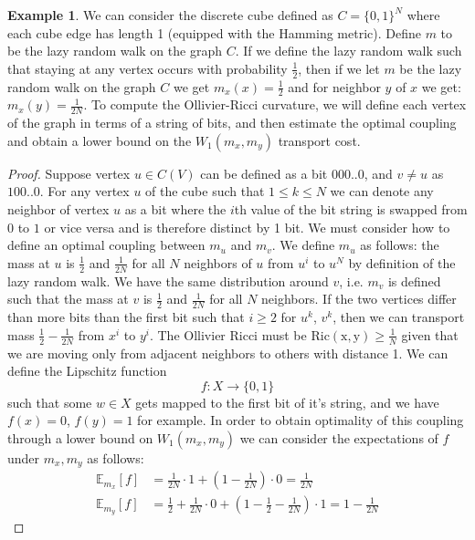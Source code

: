 \documentclass{Dissertate}
\theoremstyle{definition}
\theoremstyle{definition} %
\theoremstyle{definition}
\newtheorem{example}[theorem]{Example}
\begin{document}
\begin{example} \cite{ollivier_ricci_2009} We can consider the discrete cube defined as $C= \{0,1\}^N$ where each cube edge has length 1 (equipped with the Hamming metric). Define $m$ to be the lazy random walk on the graph $C$. If we define the lazy random walk such that staying at any vertex occurs with probability $\frac{1}{2}$, then if we let $m$ be the lazy random walk on the graph $C$ we get $m_x(x) = \frac{1}{2}$ and for neighbor $y$ of $x$ we get: $m_x(y) = \frac{1}{2N}$. To compute the Ollivier-Ricci curvature, we will define each vertex of the graph in terms of a string of bits, and then estimate the optimal coupling and obtain a lower bound on the $W_1(m_x, m_y)$ transport cost. 

\begin{proof}
Suppose vertex $u \in C(V)$ can be defined as a bit $000..0$, and $v \neq u$  as $100..0$. For any vertex $u$ of the cube such that $1 \leq k \leq N$  we can denote any neighbor of vertex $u$ as a bit where the $i$th value of the bit string is swapped from $0$ to $1$ or vice versa and is therefore distinct by 1 bit. We must consider how to define an optimal coupling between $m_u$ and $m_v$. We define $m_u$ as follows: the mass at $u$ is $\frac{1}{2}$ and $\frac{1}{2N}$ for all $N$ neighbors of $u$ from $u^i$ to $u^N$ by definition of the lazy random walk. We have the same distribution around $v$, i.e. $m_v$ is defined such that the mass at $v$ is $\frac{1}{2}$ and $\frac{1}{2N}$ for all $N$ neighbors. If the two vertices differ than more bits than the first bit such that $i \geq 2$ for $u^k$, $v^k$, then we can transport mass $\frac{1}{2} - \frac{1}{2N}$ from $x^i$ to $y^i$. The Ollivier Ricci must be $\operatorname{Ric (x,y)}\geq \frac{1}{N}$ given that we are moving only from adjacent neighbors to others with distance 1. We can define the Lipschitz function
$$
f: X \rightarrow \{0,1\}
$$
such that some $w \in X$ gets mapped to the first bit of it's string, and we have $f(x) = 0$, $f(y) = 1$ for example. In order to obtain optimality of this coupling through a lower bound on $W_1(m_x, m_y)$ we can consider the expectations of $f$ under $m_x, m_y$ as follows:
\[
\begin{aligned}
\mathbb{E}_{m_x}[f] &= \frac{1}{2N} \cdot 1 + \left(1 - \frac{1}{2N} \right) \cdot 0 = \frac{1}{2N} \\
\mathbb{E}_{m_y}[f] &= \frac{1}{2} + \frac{1}{2N} \cdot 0 + \left(1 - \frac{1}{2} - \frac{1}{2N} \right) \cdot 1 = 1 - \frac{1}{2N}
\end{aligned}
\]


\end{proof}
\end{example}
\end{document}

